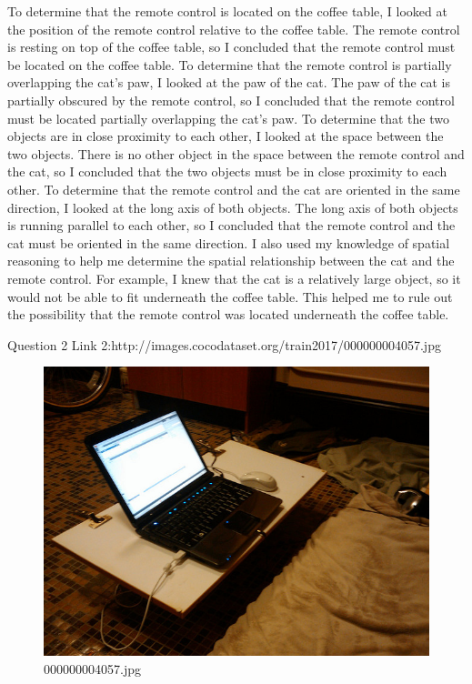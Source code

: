 \begin{enumerate}
{        To determine that the remote control is located on the coffee table, I looked at the position of the remote control relative to the coffee table. The remote control is resting on top of the coffee table, so I concluded that the remote control must be located on the coffee table.
        To determine that the remote control is partially overlapping the cat's paw, I looked at the paw of the cat. The paw of the cat is partially obscured by the remote control, so I concluded that the remote control must be located partially overlapping the cat's paw.
        To determine that the two objects are in close proximity to each other, I looked at the space between the two objects. There is no other object in the space between the remote control and the cat, so I concluded that the two objects must be in close proximity to each other.
        To determine that the remote control and the cat are oriented in the same direction, I looked at the long axis of both objects. The long axis of both objects is running parallel to each other, so I concluded that the remote control and the cat must be oriented in the same direction.
        I also used my knowledge of spatial reasoning to help me determine the spatial relationship between the cat and the remote control. For example, I knew that the cat is a relatively large object, so it would not be able to fit underneath the coffee table. This helped me to rule out the possibility that the remote control was located underneath the coffee table.}
    \end{enumerate}
Question 2
Link 2:http://images.cocodataset.org/train2017/000000004057.jpg
    \begin{figure}[h]
        \centering
        \includegraphics[width=0.8\linewidth]{../image set/easy/000000004057.jpg}
        \caption{000000004057.jpg}
    \end{figure}
